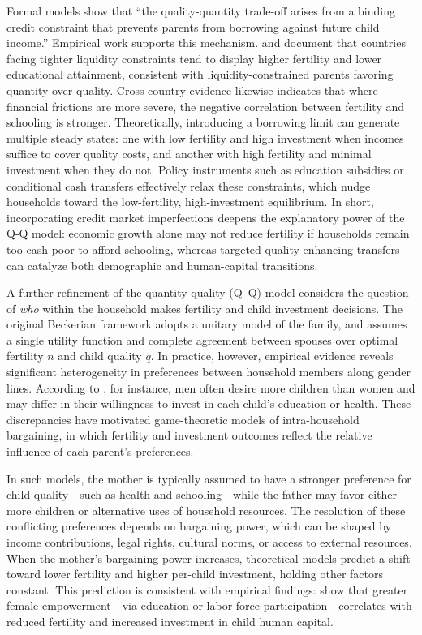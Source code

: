 \documentclass[]{AEA}
\begin{document}
Formal models show that ``the quality-quantity trade-off arises from a
binding credit constraint that prevents parents from borrowing against
future child income.'' Empirical work supports this mechanism.
\citet{kremer2002income} and \citet{de2003inequality} document that
countries facing tighter liquidity constraints tend to display higher
fertility and lower educational attainment, consistent with
liquidity-constrained parents favoring quantity over quality.
Cross-country evidence likewise indicates that where financial frictions
are more severe, the negative correlation between fertility and
schooling is stronger. Theoretically, introducing a borrowing limit can
generate multiple steady states: one with low fertility and high
investment when incomes suffice to cover quality costs, and another with
high fertility and minimal investment when they do not. Policy
instruments such as education subsidies or conditional cash transfers
effectively relax these constraints, which nudge households toward the
low-fertility, high-investment equilibrium. In short, incorporating
credit market imperfections deepens the explanatory power of the Q-Q
model: economic growth alone may not reduce fertility if households
remain too cash-poor to afford schooling, whereas targeted
quality-enhancing transfers can catalyze both demographic and
human-capital transitions.

A further refinement of the quantity-quality (Q--Q) model considers the
question of \emph{who} within the household makes fertility and child
investment decisions. The original Beckerian framework adopts a unitary
model of the family, and assumes a single utility function and complete
agreement between spouses over optimal fertility \(n\) and child quality
\(q\). In practice, however, empirical evidence reveals significant
heterogeneity in preferences between household members along gender
lines. According to \citet{oppenheim1987impact, thomas1990intra}, for
instance, men often desire more children than women and may differ in
their willingness to invest in each child's education or health. These
discrepancies have motivated game-theoretic models of intra-household
bargaining, in which fertility and investment outcomes reflect the
relative influence of each parent's preferences.

In such models, the mother is typically assumed to have a stronger
preference for child quality---such as health and schooling---while the
father may favor either more children or alternative uses of household
resources. The resolution of these conflicting preferences depends on
bargaining power, which can be shaped by income contributions, legal
rights, cultural norms, or access to external resources. When the
mother's bargaining power increases, theoretical models predict a shift
toward lower fertility and higher per-child investment, holding other
factors constant. This prediction is consistent with empirical findings:
\citet{iyigun2007endogenous, doepke2019bargaining} show that greater
female empowerment---via education or labor force
participation---correlates with reduced fertility and increased
investment in child human capital.
\end{document}
